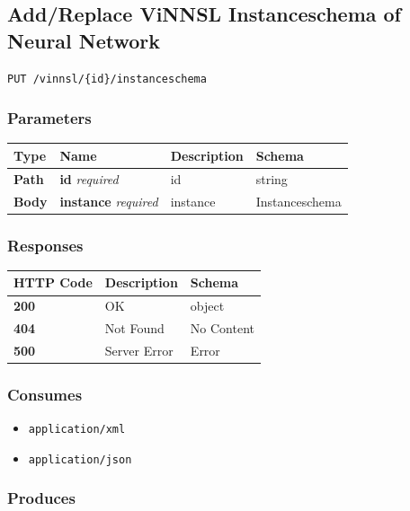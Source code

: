 \subsection{Add/Replace ViNNSL Instanceschema of Neural
Network}\label{addreplace-vinnsl-instanceschema-of-neural-network}

\begin{verbatim}
PUT /vinnsl/{id}/instanceschema
\end{verbatim}

\subsubsection{Parameters}\label{parameters-6}

\begin{longtable}[]{@{}llll@{}}
\toprule
Type & Name & Description & Schema\tabularnewline
\midrule
\endhead
\textbf{Path} & \textbf{id} \emph{required} & id & string\tabularnewline
\textbf{Body} & \textbf{instance} \emph{required} & instance &
Instanceschema\tabularnewline
\bottomrule
\end{longtable}

\subsubsection{Responses}\label{responses-7}

\begin{longtable}[]{@{}lll@{}}
\toprule
HTTP Code & Description & Schema\tabularnewline
\midrule
\endhead
\textbf{200} & OK & object\tabularnewline
\textbf{404} & Not Found & No Content\tabularnewline
\textbf{500} & Server Error & Error\tabularnewline
\bottomrule
\end{longtable}

\subsubsection{Consumes}\label{consumes-3}

\begin{itemize}
\tightlist
\item
  \texttt{application/xml}
\item
  \texttt{application/json}
\end{itemize}

\subsubsection{Produces}\label{produces-7}

